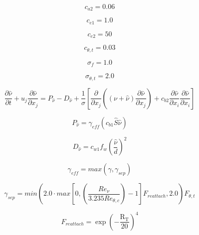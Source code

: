 \begin{equation}
c_{a2}=0.06
\end{equation}

\begin{equation}
c_{e1}=1.0
\end{equation}

\begin{equation}
c_{e2}=50
\end{equation}

\begin{equation}
c_{\theta,t}=0.03
\end{equation}

\begin{equation}
\sigma_{f}=1.0
\end{equation}

\begin{equation}
\sigma_{\theta,t}=2.0
\end{equation}

\begin{equation}
\frac{\partial \widehat \nu}{\partial t} + u_j \frac{\partial \widehat \nu}{\partial x_j} =
P_{\widehat \nu} - D_{\widehat \nu} + 
\frac{1}{\sigma} \left[ \frac{\partial}{\partial x_j}
 \left( \left( \nu + \widehat \nu \right) \frac{\partial \widehat \nu}{\partial x_j} \right)
 + {c_{b2}}\frac{\partial \widehat \nu}{\partial x_i} \frac{\partial \widehat \nu}{\partial x_i}
 \right]
\end{equation}

\begin{equation}
P_{\widehat \nu} = \gamma_{eff} \left( c_{b1}\widehat S \widehat \nu \right)
\end{equation}

\begin{equation}
D_{\widehat \nu} = c_{w1} f_{w} \left( \frac{\widehat \nu}{{d}} \right)^2
\end{equation}

\begin{equation}
\gamma_{eff} = max \left( \gamma, \gamma_{sep} \right)
\end{equation}

\begin{equation}
\gamma_{sep} = min \left( 2.0 \cdot max \left[ 0 , \left( \frac{Re_\nu}{3.235 Re_{\theta,c}} \right) -1\right]
F_{reattach}, 2.0 \right)F_{\theta,t}
\end{equation}

\begin{equation}
F_{reattach} = \exp\left(-\frac{\mathrm{R_T}}{20}\right)^4
\end{equation}

